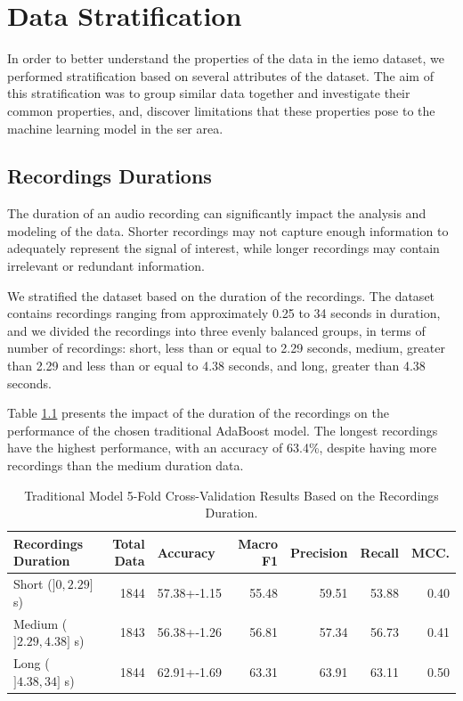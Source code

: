 \chapter{Data Stratification}
\label{chapter:data_stratification}


In order to better understand the properties of the data in the \ac{iemo} dataset, we performed stratification based on several attributes of the dataset. The aim of this stratification was to group similar data together and investigate their common properties, and, discover limitations that these properties pose to the machine learning model in the \ac{ser} area.

\section{Recordings Durations}

The duration of an audio recording can significantly impact the analysis and modeling of the data. Shorter recordings may not capture enough information to adequately represent the signal of interest, while longer recordings may contain irrelevant or redundant information.

We stratified the dataset based on the duration of the recordings. The dataset contains recordings ranging from approximately 0.25 to 34 seconds in duration, and we divided the recordings into three evenly balanced groups, in terms of number of recordings: short, less than or equal to  2.29 seconds, medium, greater than 2.29 and less than or equal to 4.38 seconds, and long, greater than 4.38 seconds.

Table \ref{5:durations} presents the impact of the duration of the recordings on the performance of the chosen traditional AdaBoost model. The longest recordings have the highest performance, with an accuracy of 63.4\%, despite having more recordings than the medium duration data. 

\begin{table}[H]
	\centering
	\caption{Traditional Model 5-Fold Cross-Validation Results Based on the Recordings Duration.}
	\label{5:durations}
	\begin{tabular}{lrlrrrr}
		\toprule
		Recordings Duration &   Total Data & Accuracy    &   Macro F1 &   Precision &   Recall &   MCC. \\
		\midrule
		Short ($]0, 2.29]$ s)	 	&      1844 & 57.38+-1.15 &   55.48 &  59.51 &  53.88 &  0.40  \\
		Medium ($]2.29, 4.38]$ s) 	&      1843 & 56.38+-1.26 &   56.81 &  57.34 &  56.73 &  0.41 \\
		Long ($]4.38, 34]$ s) 		&      1844 & 62.91+-1.69 &   63.31 &  63.91 &  63.11 &  0.50  \\
		
		
		\bottomrule
	\end{tabular}
\end{table}

